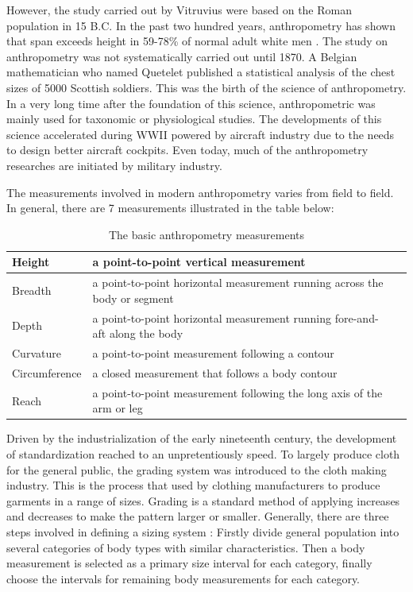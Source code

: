 However, the study carried out by Vitruvius were based on the Roman population in 15 B.C. In the past two hundred years, anthropometry has shown that span exceeds height in 59-78\% of normal adult white men \cite{Schott19921518}. The study on anthropometry was not systematically carried out until 1870. A Belgian mathematician who named Quetelet published a statistical analysis of the chest sizes of 5000 Scottish soldiers\cite{quetelet2011anthropométrie}. This was the birth of the science of anthropometry. In a very long time after the foundation of this science, anthropometric was mainly used for taxonomic or physiological studies. The developments of this science accelerated during WWII powered by aircraft industry due to the needs to design better aircraft cockpits. Even today, 
much of the anthropometry researches are initiated by military industry. 

The measurements involved in modern anthropometry varies from field to field. In general, 
there are 7 measurements illustrated in the table below:

\begin{table}[ht]
        \centering
        \begin{tabular}{|l|m{7cm}|l|}
        \hline
        Height & a point-to-point vertical measurement\\
        \hline
        Breadth & a point-to-point horizontal measurement running across the body or segment\\
        \hline
		Depth & a point-to-point horizontal measurement running fore-and-aft along the body\\
		\hline
		Curvature & a point-to-point measurement following a contour\\
		\hline
		Circumference &  a closed measurement that follows a body contour\\
		\hline
		Reach & a point-to-point measurement following the long axis of the arm or leg\\
		\hline
        \end{tabular}
        \caption{The basic anthropometry measurements}
        \label{table:tab4}
\end{table}

Driven by the industrialization of the early nineteenth century, the development of standardization reached to an unpretentiously speed. To largely produce cloth for the general public, the grading system was introduced to the cloth making industry. This is the process that used by clothing manufacturers to produce garments in a range of sizes. Grading is a standard method of applying increases and decreases to make the pattern larger or smaller. 
Generally, there are three steps involved in defining a sizing system \cite{Schofield01012005}: Firstly divide general population into several categories of body types with similar characteristics. Then a body measurement is selected as a primary size interval for each category, finally choose the intervals for remaining body measurements for each category. 

